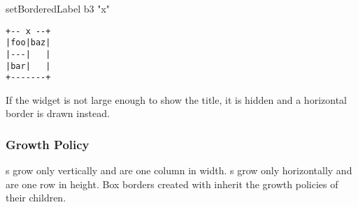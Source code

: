 \begin{haskellcode}
 setBorderedLabel b3 "x"
\end{haskellcode}

\begin{verbatim}
+-- x --+
|foo|baz|
|---|   |
|bar|   |
+-------+
\end{verbatim}

If the  widget is not large enough to show the title, it
is hidden and a horizontal border is drawn instead.

\subsubsection{Growth Policy}

s grow only vertically and are one column in width.
s grow only horizontally and are one row in height.  Box
borders created with  inherit the growth policies of
their children.
